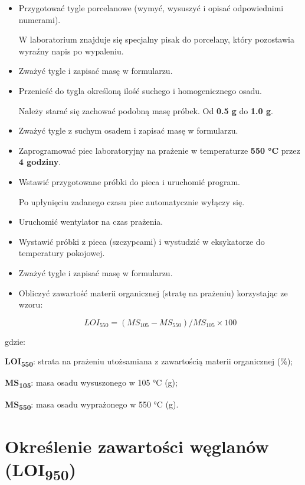 \documentclass[
  letterpaper,
  DIV=11,
  numbers=noendperiod]{scrreprt}
\begin{document}
\begin{itemize}
\item
  Przygotować tygle porcelanowe (wymyć, wysuszyć i opisać odpowiednimi
  numerami).

  W laboratorium znajduje się specjalny pisak do porcelany, który
  pozostawia wyraźny napis po wypaleniu.
\item
  Zważyć tygle i zapisać masę w formularzu.
\item
  Przenieść do tygla określoną ilość suchego i homogenicznego osadu.

  Należy starać się zachować podobną masę próbek. Od \textbf{0.5 g} do
  \textbf{1.0 g}.
\item
  Zważyć tygle z suchym osadem i zapisać masę w formularzu.
\item
  Zaprogramować piec laboratoryjny na prażenie w temperaturze
  \textbf{550 °C} przez \textbf{4 godziny}.
\item
  Wstawić przygotowane próbki do pieca i uruchomić program.

  Po upłynięciu zadanego czasu piec automatycznie wyłączy się.
\item
  Uruchomić wentylator na czas prażenia.
\item
  Wystawić próbki z pieca (szczypcami) i wystudzić w eksykatorze do
  temperatury pokojowej.
\item
  Zważyć tygle i zapisać masę w formularzu.
\item
  Obliczyć zawartość materii organicznej (stratę na prażeniu)
  korzystając ze wzoru:

  \[
  LOI_{550} = (MS_{105} - MS_{550}) / MS_{105} × 100
  \]
\end{itemize}

gdzie:

\textbf{LOI\textsubscript{550}}: strata na prażeniu utożsamiana z
zawartością materii organicznej (\%);

\textbf{MS\textsubscript{105}}: masa osadu wysuszonego w 105 °C (g);

\textbf{MS\textsubscript{550}}: masa osadu wyprażonego w 550 °C (g).

\hypertarget{okreux15blenie-zawartoux15bci-wux119glanuxf3w-loi950}{%
\section{\texorpdfstring{Określenie zawartości węglanów
(LOI\textsubscript{950})}{Określenie zawartości węglanów (LOI950)}}\label{okreux15blenie-zawartoux15bci-wux119glanuxf3w-loi950}}
\end{document}
